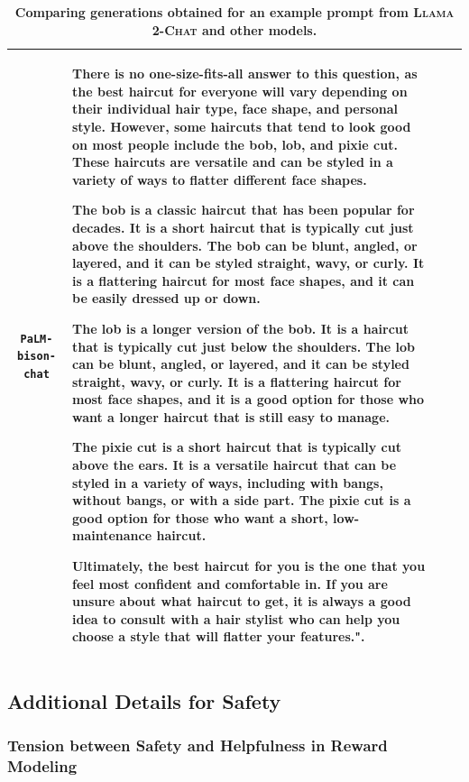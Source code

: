 \documentclass{article}
\newcommand{\modelname}{\textsc{Llama 2-Chat}\xspace}
\begin{document}
\begin{table}[htbp]
{\begin{tabular}{c p{13cm} c c }
        \midrule
        \texttt{PaLM-bison-chat} & There is no one-size-fits-all answer to this question, as the best haircut for everyone will vary depending on their individual hair type, face shape, and personal style. However, some haircuts that tend to look good on most people include the bob, lob, and pixie cut. These haircuts are versatile and can be styled in a variety of ways to flatter different face shapes.
        
        The bob is a classic haircut that has been popular for decades. It is a short haircut that is typically cut just above the shoulders. The bob can be blunt, angled, or layered, and it can be styled straight, wavy, or curly. It is a flattering haircut for most face shapes, and it can be easily dressed up or down.
        
        The lob is a longer version of the bob. It is a haircut that is typically cut just below the shoulders. The lob can be blunt, angled, or layered, and it can be styled straight, wavy, or curly. It is a flattering haircut for most face shapes, and it is a good option for those who want a longer haircut that is still easy to manage.
        
        The pixie cut is a short haircut that is typically cut above the ears. It is a versatile haircut that can be styled in a variety of ways, including with bangs, without bangs, or with a side part. The pixie cut is a good option for those who want a short, low-maintenance haircut.
        
        Ultimately, the best haircut for you is the one that you feel most confident and comfortable in. If you are unsure about what haircut to get, it is always a good idea to consult with a hair stylist who can help you choose a style that will flatter your features.".\\
    \bottomrule
    \end{tabular}}
    \caption{\textbf{Comparing generations obtained for an example prompt from \modelname and other models.}}
    
    \label{tab:helpfulness_response_example}
    
\end{table}

\subsection{Additional Details for Safety}

\subsubsection{Tension between Safety and Helpfulness in Reward Modeling}
\label{sec:tension_safety_helpfulness}
\end{document}
